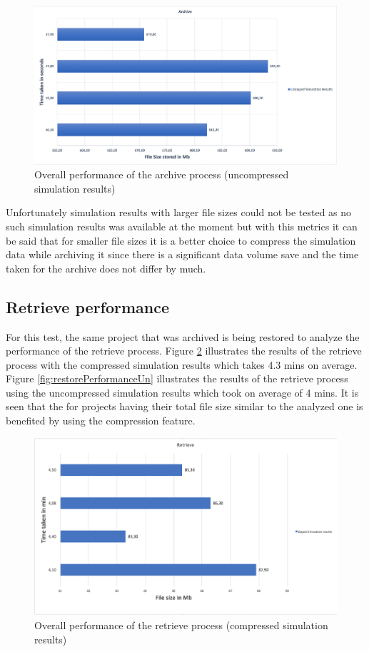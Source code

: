 \begin{figure}[H]
    \centering \includegraphics[scale=0.45]{grafiken/archiveUnzip.png}
    \caption{Overall performance of the archive process (uncompressed simulation results)}
    \label{fig:archivePerformanceUn}
\end{figure}

Unfortunately simulation results with larger file sizes could not be tested as no such simulation results was available at the moment but with this metrics it can be said that
for smaller file sizes it is a better choice to compress the simulation data while archiving it since there is a significant data volume save and the time taken for the
archive does not differ by much.   

\subsection{Retrieve performance}
For this test, the same project that was archived is being restored to analyze the performance of the retrieve process. Figure \ref{fig:restorePerformance} illustrates
the results of the retrieve process with the compressed simulation results which takes 4.3 mins on average. Figure \ref{fig:restorePerformanceUn} illustrates the
results of the retrieve process using the uncompressed simulation results which took on average of 4 mins. It is seen that the for projects having their total file
size similar to the analyzed one is benefited by using the compression feature.

\begin{figure}[H]
    \centering \includegraphics[scale=0.5]{grafiken/retrieveZip.png}
    \caption{Overall performance of the retrieve process (compressed simulation results)}
    \label{fig:restorePerformance}
\end{figure}

